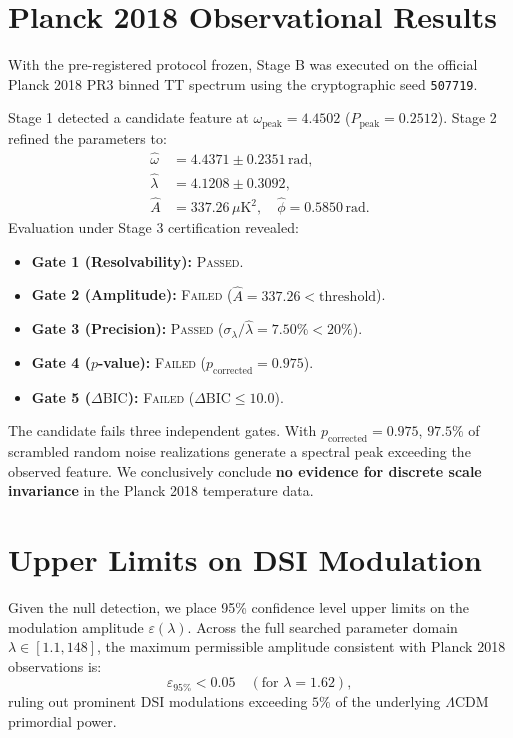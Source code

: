 \documentclass[10pt,twocolumn,a4paper]{article}
\begin{document}
\section{Planck 2018 Observational Results}
With the pre-registered protocol frozen, Stage B was executed on the official Planck 2018 PR3 binned TT spectrum using the cryptographic seed \texttt{507719}.

Stage 1 detected a candidate feature at $\omega_{\mathrm{peak}} = 4.4502$ ($P_{\mathrm{peak}} = 0.2512$). Stage 2 refined the parameters to:
\begin{align}
\hat\omega &= 4.4371 \pm 0.2351\,\mathrm{rad}, \\
\hat\lambda &= 4.1208 \pm 0.3092, \\
\hat A &= 337.26\,\mu\mathrm{K}^2, \quad \hat\phi = 0.5850\,\mathrm{rad}.
\end{align}
Evaluation under Stage 3 certification revealed:
\begin{itemize}
    \item \textbf{Gate 1 (Resolvability):} \textsc{Passed}.
    \item \textbf{Gate 2 (Amplitude):} \textsc{Failed} ($\hat A = 337.26 < \mathrm{threshold}$).
    \item \textbf{Gate 3 (Precision):} \textsc{Passed} ($\sigma_\lambda/\hat\lambda = 7.50\% < 20\%$).
    \item \textbf{Gate 4 ($p$-value):} \textsc{Failed} ($p_{\mathrm{corrected}} = 0.975$).
    \item \textbf{Gate 5 ($\Delta\mathrm{BIC}$):} \textsc{Failed} ($\Delta\mathrm{BIC} \le 10.0$).
\end{itemize}
The candidate fails three independent gates. With $p_{\mathrm{corrected}} = 0.975$, $97.5\%$ of scrambled random noise realizations generate a spectral peak exceeding the observed feature. We conclusively conclude \textbf{no evidence for discrete scale invariance} in the Planck 2018 temperature data.

\section{Upper Limits on DSI Modulation}
Given the null detection, we place 95\% confidence level upper limits on the modulation amplitude $\varepsilon(\lambda)$. Across the full searched parameter domain $\lambda \in [1.1, 148]$, the maximum permissible amplitude consistent with Planck 2018 observations is:
\begin{equation}
\varepsilon_{95\%} < 0.05 \quad (\text{for } \lambda = 1.62),
\end{equation}
ruling out prominent DSI modulations exceeding $5\%$ of the underlying $\Lambda$CDM primordial power.
\end{document}
